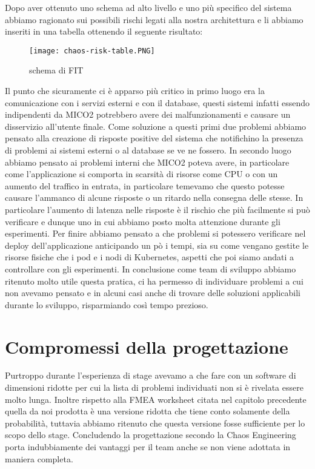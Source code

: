 Dopo aver ottenuto uno schema ad alto livello e uno più specifico del sistema abbiamo ragionato sui possibili rischi legati alla nostra architettura e li abbiamo inseriti in una tabella ottenendo il seguente risultato:
\begin{figure}[h]
    \centering
    \texttt{[image: chaos-risk-table.PNG]}
    \caption{schema di FIT}
    \label{tab:fitschema}
\end{figure}
Il punto che sicuramente ci è apparso più critico in primo luogo era la comunicazione con i servizi esterni e con il database, questi sistemi infatti essendo indipendenti da MICO2 potrebbero avere dei malfunzionamenti e causare un disservizio all'utente finale.
Come soluzione a questi primi due problemi abbiamo pensato alla creazione di risposte positive del sistema che notifichino la presenza di problemi ai sistemi esterni o al database se ve ne fossero.
In secondo luogo abbiamo pensato ai problemi interni che MICO2 poteva avere, in particolare come l'applicazione si comporta in scarsità di risorse come CPU o con un aumento del traffico in entrata, in particolare temevamo che questo potesse causare l'ammanco di alcune risposte o un ritardo nella consegna delle stesse.
In particolare l'aumento di latenza nelle risposte è il rischio che più facilmente si può verificare e dunque uno in cui abbiamo posto molta attenzione durante gli esperimenti.
Per finire abbiamo pensato a che problemi si potessero verificare nel deploy dell'applicazione anticipando un pò i tempi, sia su come vengano gestite le risorse fisiche che i pod e i nodi di Kubernetes, aspetti che poi siamo andati a controllare con gli esperimenti.
In conclusione come team di sviluppo abbiamo ritenuto molto utile questa pratica, ci ha permesso di individuare problemi a cui non avevamo pensato e in alcuni casi anche di trovare delle soluzioni applicabili durante lo sviluppo, risparmiando così tempo prezioso.

\section{Compromessi della progettazione}
Purtroppo durante l'esperienza di stage avevamo a che fare con un software di dimensioni ridotte per cui la lista di problemi individuati non si è rivelata essere molto lunga.
Inoltre rispetto alla FMEA worksheet citata nel capitolo precedente quella da noi prodotta è una versione ridotta che tiene conto solamente della probabilità, tuttavia abbiamo ritenuto che questa versione fosse sufficiente per lo scopo dello stage.
Concludendo la progettazione secondo la Chaos Engineering porta indubbiamente dei vantaggi per il team anche se non viene adottata in maniera completa.

